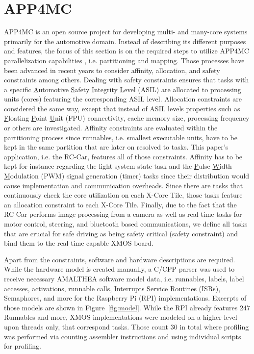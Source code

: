 \documentclass [a4paper,final,conference,10pt]{IDAACS}
\begin{document}
\section{APP4MC}
\label{sec:app4mc}
APP4MC is an open source project for developing multi- and many-core systems primarily for the automotive domain. Instead of describing its different purposes and features, the focus of this section is on the required steps to utilize APP4MC parallelization capabilities \cite{ICPDSSE}, i.e. partitioning and mapping. Those processes have been advanced in recent years to consider affinity, allocation, and safety constraints among others. Dealing with safety constraints ensures that tasks with a specific \underline{A}utomotive \underline{S}afety \underline{I}ntegrity \underline{L}evel (ASIL) are allocated to processing units (cores) featuring the corresponding ASIL level. Allocation constraints are considered the same way, except that instead of ASIL levels properties such as \underline{F}loating \underline{P}oint \underline{U}nit (FPU) connectivity, cache memory size, processing frequency or others are investigated. Affinity constraints are evaluated within the partitioning process since runnables, i.e. smallest executable units, have to be kept in the same partition that are later on resolved to tasks. This paper's application, i.e. the RC-Car, features all of those constraints. Affinity has to be kept for instance regarding the light system state task and the \underline{P}ulse \underline{W}idth \underline{M}odulation (PWM) signal generation (timer) tasks since their distribution would cause implementation and communication overheads. Since there are tasks that continuously check the core utilization on each X-Core Tile, those tasks feature an allocation constraint to each X-Core Tile. Finally, due to the fact that the RC-Car performs image processing from a camera as well as real time tasks for motor control, steering, and bluetooth based communications, we define all tasks that are crucial for safe driving as being safety critical (safety constraint) and bind them to the real time capable XMOS board. 

Apart from the constraints, software and hardware descriptions are required. While the hardware model is created manually, a C/CPP parser was used to receive necessary AMALTHEA software model data, i.e. runnables, labels, label accesses, activations, runnable calls, \underline{I}nterrupts \underline{S}ervice \underline{R}outines (ISRs), Semaphores, and more for the Raspberry Pi (RPI) implementations. Excerpts of those models are shown in Figure~\ref{fig:model}. While the RPI already features 247 Runnables and more, XMOS implementations were modeled on a higher level upon threads only, that correspond tasks. Those count 30 in total where profiling was performed via counting assembler instructions and using individual scripts for profiling.
\end{document}
